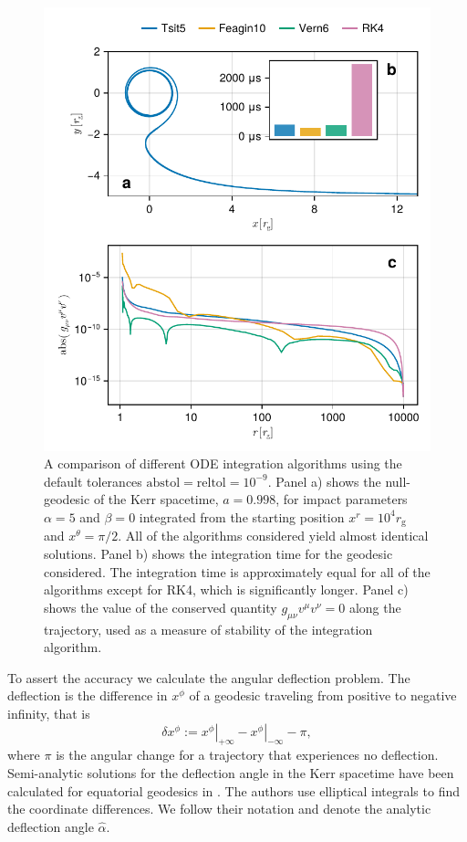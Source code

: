 \documentclass[fleqn,usenatbib]{mnras}
\newcommand{\rg}{r_\text{g}}
\begin{document}
\begin{figure}
    \centering
    \includegraphics[width=0.95\columnwidth]{figures/stability.conservation.pdf}
    \caption{A comparison of different ODE integration algorithms using the
        default tolerances $\text{abstol} = \text{reltol} = 10^{-9}$. Panel a)
        shows the null-geodesic of the Kerr spacetime, $a = 0.998$, for impact
        parameters $\alpha = 5$ and $\beta = 0$ integrated from the starting
        position $x^r = 10^4 \rg$ and $x^\theta = \pi / 2$. All of the
        algorithms considered yield almost identical solutions. Panel b) shows
        the integration time for the geodesic considered. The integration time
        is approximately equal for all of the algorithms except for RK4, which
        is significantly longer. Panel c) shows the value of the conserved
        quantity $g_{\mu \nu} v^\mu v^\nu = 0$ along the trajectory, used as a
        measure of stability of the integration algorithm.
    }
    \label{fig:dot-stability}
\end{figure}

To assert the accuracy we calculate the angular deflection problem. The
deflection is the difference in $x^\phi$ of a geodesic traveling from positive
to negative infinity, that is
\begin{equation}
    \delta x^\phi :=
        \left.x^\phi\right\rvert_{+\infty} - \left.x^\phi\right\rvert_{-\infty}
        - \pi,
\end{equation}
where $\pi$ is the angular change for a trajectory that experiences no
deflection. Semi-analytic solutions for the deflection angle in the Kerr
spacetime have been calculated for equatorial geodesics in
\cite{iyer_lights_2009}. The authors use elliptical integrals to find the
coordinate differences. We follow their notation and denote the analytic
deflection angle $\hat{\alpha}$.
\end{document}
